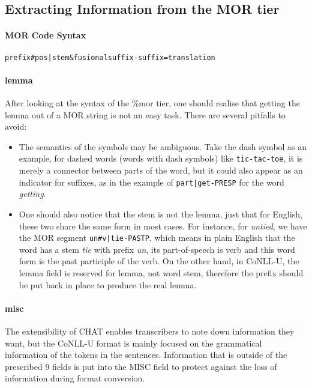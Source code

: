 \subsection{Extracting Information from the MOR tier}



\paragraph{MOR Code Syntax}

\texttt{prefix\#pos|stem\&fusionalsuffix-suffix=translation}



\paragraph{lemma} After looking at the syntax of the \%mor tier, one should realise that getting the lemma out of a MOR string is not an easy task. There are several pitfalls to avoid:\\
\begin{itemize}
	\item The semantics of the symbols may be ambiguous. Take the dash symbol as an example, for dashed words (words with dash symbols) like \texttt{tic-tac-toe}, it is merely a connector between parts of the word, but it could also appear as an indicator for suffixes, as in the example of \texttt{part|get-PRESP} for the word \emph{getting}.
	\item One should also notice that the stem is not the lemma, just that for English, these two share the same form in most cases. For instance, for \emph{untied}, we have the MOR segment \texttt{un\#v|tie-PASTP}, which means in plain English that the word has a stem \emph{tie} with prefix \emph{un}, its part-of-speech is verb and this word form is the past participle of the verb. On the other hand, in CoNLL-U, the lemma field is reserved for lemma, not word stem, therefore the prefix should be put back in place to produce the real lemma.
\end{itemize}

\paragraph{misc}
The extensibility of CHAT enables transcribers to note down information they want, but the CoNLL-U format is mainly focused on the grammatical information of the tokens in the sentences. Information that is outside of the prescribed 9 fields is put into the MISC field to protect against the loss of information during format conversion.

